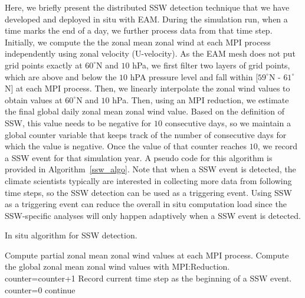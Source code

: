 \documentclass{juliacon}
\begin{document}
Here, we briefly present the distributed SSW detection technique that we have developed and deployed in situ with EAM. During the simulation run, when a time marks the end of a day, we further process data from that time step. Initially, we compute the the zonal mean zonal wind at each MPI process independently using zonal velocity (U-velocity). As the EAM mesh does not put grid points exactly at $60^{\circ}$N and $10$ hPa, we first filter two layers of grid points, which are above and below the $10$ hPA pressure level and fall within [$59^{\circ}$N - $61^{\circ}$N] at each MPI process. Then, we linearly interpolate the zonal wind values to obtain values at $60^{\circ}$N and $10$ hPa. Then, using an MPI reduction, we estimate the final global daily zonal mean zonal wind value. Based on the definition of SSW, this value needs to be negative for $10$ consecutive days, so we maintain a global counter variable that keeps track of the number of consecutive days for which the value is negative. Once the value of that counter reaches $10$, we record a SSW event for that simulation year. A pseudo code for this algorithm is provided in Algorithm~\ref{ssw_algo}. Note that when a SSW event is detected, the climate scientists typically are interested in collecting more data from following time steps, so the SSW detection can be used as a triggering event. Using SSW as a triggering event can reduce the overall in situ computation load since the SSW-specific analyses will only happen adaptively when a SSW event is detected.


\begin{algorithm}
\caption{In situ algorithm for SSW detection.}\label{ssw_algo}
\begin{algorithmic}[1]
\Statex
{}
    \State Compute partial zonal mean zonal wind values
    \State at each MPI process.
    \State Compute the global zonal mean zonal wind
    \State values with MPI:Reduction.
    \State counter=counter+1
    \EndIf
    \State Record current time step as the beginning of
    \State a SSW event.
    \State counter=0
    \EndIf
  \Else
    \State continue
  \EndIf
\EndFor
\end{algorithmic}
\end{algorithm}
\end{document}
